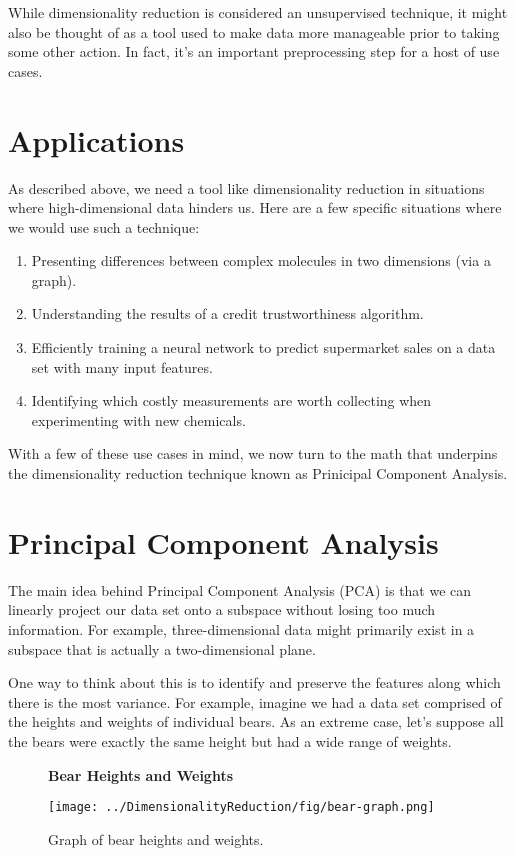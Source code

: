 While dimensionality reduction is considered an unsupervised technique, it might also be thought of as a tool used to make data more manageable prior to taking some other action. In fact, it's an important preprocessing step for a host of use cases.

\section{Applications}
As described above, we need a tool like dimensionality reduction in situations where high-dimensional data hinders us. Here are a few specific situations where we would use such a technique:

\begin{enumerate}
    \item Presenting differences between complex molecules in two dimensions (via a graph).
    \item Understanding the results of a credit trustworthiness algorithm.
    \item Efficiently training a neural network to predict supermarket sales on a data set with many input features.
    \item Identifying which costly measurements are worth collecting when experimenting with new chemicals.
\end{enumerate}

With a few of these use cases in mind, we now turn to the math that underpins the dimensionality reduction technique known as Prinicipal Component Analysis.

\section{Principal Component Analysis}
The main idea behind Principal Component Analysis (PCA) is that we can linearly project our data set onto a subspace without losing too much information. For example, three-dimensional data might primarily exist in a subspace that is actually a two-dimensional plane.

One way to think about this is to identify and preserve the features along which there is the most variance. For example, imagine we had a data set comprised of the heights and weights of individual bears. As an extreme case, let's suppose all the bears were exactly the same height but had a wide range of weights.

\begin{figure}
    \centering
    \textbf{Bear Heights and Weights}\par\medskip
    \texttt{[image: ../DimensionalityReduction/fig/bear-graph.png]}
    \caption{Graph of bear heights and weights.}
    \label{fig:bear-graph}
\end{figure}

